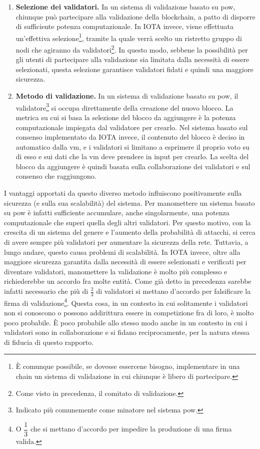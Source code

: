 \documentclass[12pt,a4paper,openright,twoside]{report}
\begin{document}
\begin{enumerate}[font=\bfseries]
    \item \textbf{Selezione dei validatori.} In un sistema di validazione basato su \acrlong{pow}, chiunque può partecipare alla validazione della blockchain, a patto di disporre di sufficiente potenza computazionale. In IOTA invece, viene effettuata un'effettiva selezione\footnote{È comunque possibile, se dovesse essercene bisogno, implementare in una chain un sistema di validazione in cui chiunque è libero di partecipare.}, tramite la quale verrà scelto un ristretto gruppo di nodi che agiranno da validatori\footnote{Come visto in precedenza, il comitato di validazione.}. In questo modo, sebbene la possibilità per gli utenti di partecipare alla validazione sia limitata dalla necessità di essere selezionati, questa selezione garantisce validatori fidati e quindi una maggiore sicurezza.
    \item \textbf{Metodo di validazione.} In un sistema di validazione basato su \acrlong{pow}, il validatore\footnote{Indicato più comunemente come minatore nel sistema \acrshort{pow}.} si occupa direttamente della creazione del nuovo blocco. La metrica su cui si basa la selezione del blocco da aggiungere è la potenza computazionale impiegata dal validatore per crearlo. Nel sistema basato sul consenso implementato da IOTA invece, il contenuto del blocco è deciso in automatico dalla \acrshort{vm}, e i validatori si limitano a esprimere il proprio voto su di esso e sui dati che la \acrshort{vm} deve prendere in input per crearlo. La scelta del blocco da aggiungere è quindi basata sulla collaborazione dei validatori e sul consenso che raggiungono. 
\end{enumerate}
I vantaggi apportati da questo diverso metodo influiscono positivamente sulla sicurezza (e sulla sua scalabilità) del sistema. Per manomettere un sistema basato su \acrlong{pow} è infatti sufficiente accumulare, anche singolarmente, una potenza computazionale che superi quella degli altri validatori. Per questo motivo, con la crescita di un sistema del genere e l'aumento della probabilità di attacchi, si cerca di avere sempre più validatori per aumentare la sicurezza della rete. Tuttavia, a lungo andare, questo causa problemi di scalabilità. In IOTA invece, oltre alla maggiore sicurezza garantita dalla necessità di essere selezionati e verificati per diventare validatori, manomettere la validazione è molto più complesso e richiederebbe un accordo fra molte entità. Come già detto in precedenza sarebbe infatti necessario che più di \(\frac{2}{3}\) di validatori si mettano d'accordo per falsificare la firma di validazione\footnote{O \(\dfrac{1}{3}\) che si mettano d'accordo per impedire la produzione di una firma valida.}. Questa cosa, in un contesto in cui solitamente i validatori non si conoscono o possono addirittura essere in competizione fra di loro, è molto poco probabile. È poco probabile allo stesso modo anche in un contesto in cui i validatori sono in collaborazione e si fidano reciprocamente, per la natura stessa di fiducia di questo rapporto.\\
\end{document}

